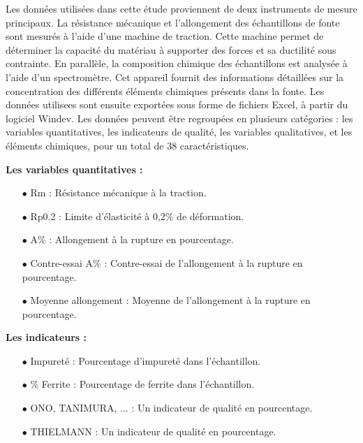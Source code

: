 \documentclass[12pt]{article}
\begin{document}
Les données utilisées dans cette étude proviennent de deux instruments 
de mesure principaux. La résistance mécanique et l'allongement des 
échantillons de fonte sont mesurés à l'aide d'une machine de traction. 
Cette machine permet de déterminer la capacité du matériau à supporter 
des forces et sa ductilité sous contrainte. En parallèle, la composition chimique des échantillons est analysée à 
l'aide d'un spectromètre. Cet appareil fournit des informations détaillées 
sur la concentration des différents éléments chimiques présents dans la 
fonte. Les données utilisees sont ensuite exportées sous forme de fichiers 
Excel, à partir du logiciel Windev. Les données peuvent être regroupées 
en plusieurs catégories : les variables quantitatives, les indicateurs 
de qualité, les variables qualitatives, et les éléments chimiques, pour 
un total de 38 caractéristiques.

\vspace{0.5cm}

\textbf{Les variables quantitatives :}

\begin{itemize}
\item[$\bullet$] Rm : Résistance mécanique à la traction.
\item[$\bullet$] Rp0.2 : Limite d'élasticité à 0,2\% de déformation.
\item[$\bullet$] A\% : Allongement à la rupture en pourcentage.
\item[$\bullet$] Contre-essai A\% : Contre-essai de l'allongement à la rupture en pourcentage.
\item[$\bullet$] Moyenne allongement : Moyenne de l'allongement à la rupture en pourcentage.
\end{itemize}
    
\vspace{0.5cm}

\textbf{Les indicateurs :}

\begin{itemize}
\item[$\bullet$] Impureté : Pourcentage d'impureté dans l'échantillon.
\item[$\bullet$] \% Ferrite : Pourcentage de ferrite dans l'échantillon.
\item[$\bullet$] ONO, TANIMURA, ... : Un indicateur de qualité en pourcentage.
\item[$\bullet$] THIELMANN : Un indicateur de qualité en pourcentage.
\end{itemize}
 
\end{document}
